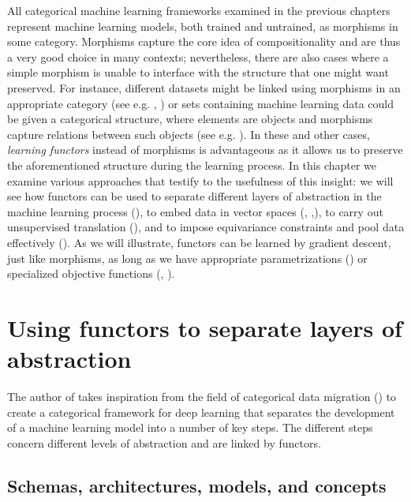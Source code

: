 \documentclass[11pt,a4paper,openright,twoside]{report}
\theoremstyle{plain}
\theoremstyle{definition}
\begin{document}
All categorical machine learning frameworks examined in the previous chapters represent machine learning models, both trained and untrained, as morphisms in some category. Morphisms capture the core idea of compositionality and are thus a very good choice in many contexts; nevertheless, there are also cases where a simple morphism is unable to interface with the structure that one might want preserved. For instance, different datasets might be linked using morphisms in an appropriate category (see e.g. \cite{spivak2012functorial}, \cite{gavranovic2019compositional}) or sets containing machine learning data could be given a categorical structure, where elements are objects and morphisms capture relations between such objects (see e.g. \cite{lambek1999type}). In these and other cases, \textit{learning functors} instead of morphisms is advantageous as it allows us to preserve the aforementioned structure during the learning process. In this chapter we examine various approaches that testify to the usefulness of this insight: we will see how functors can be used to separate different layers of abstraction in the machine learning process (\cite{gavranovic2019compositional}), to embed data in vector spaces (\cite{sheshmani2021categorical}, \cite{coecke2010mathematical},\cite{lewis2019compositionality}), to carry out unsupervised translation (\cite{sheshmani2021categorical}), and to impose equivariance constraints and pool data effectively (\cite{chytas2024poolingimagedatasetsmultiple}).
As we will illustrate, functors can be learned by gradient descent, just like morphisms, as long as we have appropriate parametrizations (\cite{gavranovic2019compositional}) or specialized objective functions (\cite{sheshmani2021categorical}, \cite{chytas2024poolingimagedatasetsmultiple}). 

\section{Using functors to separate layers of abstraction}

The author of \cite{gavranovic2019compositional} takes inspiration from the field of categorical data migration (\cite{spivak2012functorial}) to create a categorical framework for deep learning that separates the development of a machine learning model into a number of key steps. The different steps concern different levels of abstraction and are linked by functors.

\subsection{Schemas, architectures, models, and concepts}
\end{document}
